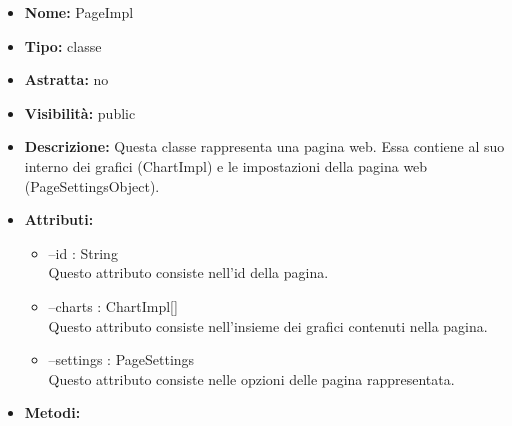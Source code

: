 			
			\begin{itemize}
			\item \textbf{Nome:} PageImpl
			\item \textbf{Tipo:} classe
			
		\item \textbf{Astratta:}
		no
			\item \textbf{Visibilità:} public
			\item \textbf{Descrizione:} Questa classe rappresenta una pagina web. Essa contiene al suo interno dei grafici (ChartImpl) e le impostazioni della pagina web (PageSettingsObject).
			\item \textbf{Attributi:}
				\begin{itemize}
				\setlength{\itemsep}{5pt}
				
					\item[\ding{111}] {--id : String} \\ [1mm] Questo attributo consiste nell'id della pagina.
					\item[\ding{111}] {--charts : ChartImpl[]} \\ [1mm] Questo attributo consiste nell'insieme dei grafici contenuti nella pagina.
					\item[\ding{111}] {--settings : PageSettings} \\ [1mm] Questo attributo consiste nelle opzioni delle pagina rappresentata.
				\end{itemize}
		
			\item \textbf{Metodi:}
				\begin{itemize}
				\setlength{\itemsep}{5pt}
				

\end{itemize}
\end{itemize}
